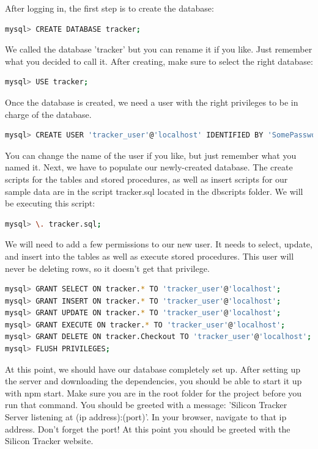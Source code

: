 \documentclass[10pt, onecolumn, twoside, peerreview]{IEEEtran}
\begin{document}
After logging in, the first step is to create the database:

\begin{lstlisting}[language=bash]
mysql> CREATE DATABASE tracker;
\end{lstlisting}

We called the database 'tracker' but you can rename it if you like. Just remember what you decided to call it. After creating, make sure to select the right database:
\begin{lstlisting}[language=bash]
mysql> USE tracker;
\end{lstlisting}

Once the database is created, we need a user with the right privileges to be in charge of the database.
\begin{lstlisting}[language=bash]
mysql> CREATE USER 'tracker_user'@'localhost' IDENTIFIED BY 'SomePassword';
\end{lstlisting}

You can change the name of the user if you like, but just remember what you named it.
Next, we have to populate our newly-created database. The create scripts for the tables and stored procedures, as well as insert scripts for our sample data are in the script tracker.sql located in the dbscripts folder. We will be executing this script:
\begin{lstlisting}[language=bash]
mysql> \. tracker.sql;
\end{lstlisting}

We will need to add a few permissions to our new user. It needs to select, update, and insert into the tables as well as execute stored procedures. This user will never be deleting rows, so it doesn't get that privilege.

\begin{lstlisting}[language=bash]
mysql> GRANT SELECT ON tracker.* TO 'tracker_user'@'localhost';
mysql> GRANT INSERT ON tracker.* TO 'tracker_user'@'localhost';
mysql> GRANT UPDATE ON tracker.* TO 'tracker_user'@'localhost';
mysql> GRANT EXECUTE ON tracker.* TO 'tracker_user'@'localhost';
mysql> GRANT DELETE ON tracker.Checkout TO 'tracker_user'@'localhost';
mysql> FLUSH PRIVILEGES;
\end{lstlisting}

At this point, we should have our database completely set up.
After setting up the server and downloading the dependencies, you should be able to start it up with npm start. Make sure you are in the root folder for the project before you run that command. You should be greeted with a message: 'Silicon Tracker Server listening at (ip address):(port)'. In your browser, navigate to that ip address. Don't forget the port! At this point you should be greeted with the Silicon Tracker website.
\end{document}
